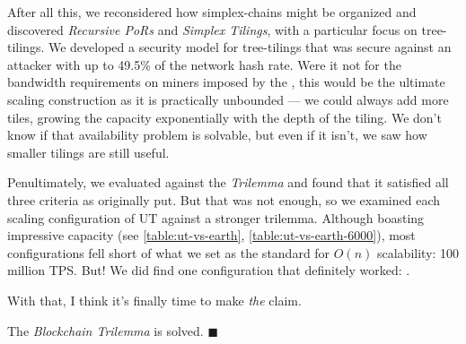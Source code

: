 After all this, we reconsidered how simplex-chains might be organized and discovered \emph{Recursive PoRs} and \emph{Simplex Tilings}, with a particular focus on tree-tilings.
We developed a security model for tree-tilings that was secure against an attacker with up to 49.5\% of the network hash rate.
Were it not for the bandwidth requirements on miners imposed by the \AxiomOfAvailability{}, this would be the ultimate scaling construction as it is practically unbounded --- we could always add more tiles, growing the capacity exponentially with the depth of the tiling.
We don't know if that availability problem is solvable, but even if it isn't, we saw how smaller tilings are still useful.

Penultimately, we evaluated  against the \emph{Trilemma} and found that it satisfied all three criteria as originally put.
But that was not enough, so we examined each scaling configuration of UT against a stronger trilemma.
Although boasting impressive capacity (see \autoref{table:ut-vs-earth}, \autoref{table:ut-vs-earth-6000}), most configurations fell short of what we set as the standard for $O(n)$ scalability: 100 million TPS.
But! We did find one configuration that definitely worked: .

With that, I think it's finally time to make \emph{the} claim.

The \emph{Blockchain Trilemma} is solved. $\blacksquare$




\newcommand\trilTableFnA{
    If the block availability problem can be solved for tilings, then all tilings are $O(n)$ scalable since their capacity is unbounded.
    If it cannot, tilings are still useful but do not provide $O(n)$ scaling on their own.
}

\newcommand\trilTableFnB{
    \UTinf{3} is decentralized if the maximum tiling depth is kept low.
    As we found earlier, \UTinf{3} with $d \le 3$ provided a tolerable $\Delta S$, and lead to a network-wide TPS of around $10^8$, even though we assumed dapp-chain headers to be $10\times$ worse than the theoretical maximum (dapp-chain headers would be $\sim1000$ bytes).
    \emph{This specific case} is what ``Yes'' refers to.
}

